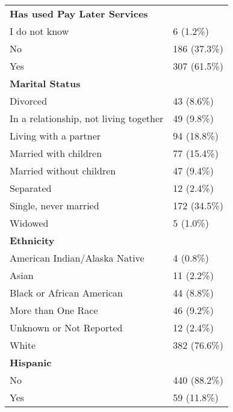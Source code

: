 \begin{longtable}{ll}
\textbf{Has used Pay Later Services} & \\
\hspace{1em}I do not know & 6 (1.2\%) \\
\hspace{1em}No & 186 (37.3\%) \\
\hspace{1em}Yes & 307 (61.5\%) \\

\textbf{Marital Status} & \\
\hspace{1em}Divorced & 43 (8.6\%) \\
\hspace{1em}In a relationship, not living together & 49 (9.8\%) \\
\hspace{1em}Living with a partner & 94 (18.8\%) \\
\hspace{1em}Married with children & 77 (15.4\%) \\
\hspace{1em}Married without children & 47 (9.4\%) \\
\hspace{1em}Separated & 12 (2.4\%) \\
\hspace{1em}Single, never married & 172 (34.5\%) \\
\hspace{1em}Widowed & 5 (1.0\%) \\

\textbf{Ethnicity} & \\
\hspace{1em}American Indian/Alaska Native & 4 (0.8\%) \\
\hspace{1em}Asian & 11 (2.2\%) \\
\hspace{1em}Black or African American & 44 (8.8\%) \\
\hspace{1em}More than One Race & 46 (9.2\%) \\
\hspace{1em}Unknown or Not Reported & 12 (2.4\%) \\
\hspace{1em}White & 382 (76.6\%) \\

\textbf{Hispanic} & \\
\hspace{1em}No & 440 (88.2\%) \\
\hspace{1em}Yes & 59 (11.8\%) \\


\end{longtable}
